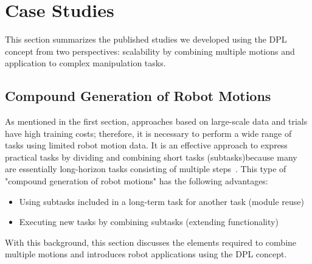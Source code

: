 

\section{Case Studies}

This section summarizes the published studies we developed using the DPL concept from two perspectives: scalability by combining multiple motions and application to complex manipulation tasks.



\subsection{Compound Generation of Robot Motions}
\label{sec_case_studies}

As mentioned in the first section, approaches based on large-scale data and trials have high training costs; therefore, it is necessary to perform a wide range of tasks using limited robot motion data. It is an effective approach to express practical tasks by dividing and combining short tasks (subtasks)because many are essentially long-horizon tasks consisting of multiple steps~\cite{Sacerdoti1974ai,Wolpert1998,Schaal2003isrr}. This type of "compound generation of robot motions" has the following advantages:
\begin{itemize}
    \item Using subtasks included in a long-term task for another task (module reuse)
    \item Executing new tasks by combining subtasks (extending functionality)
\end{itemize}
With this background, this section discusses the elements required to combine multiple motions and introduces robot applications using the DPL concept.


